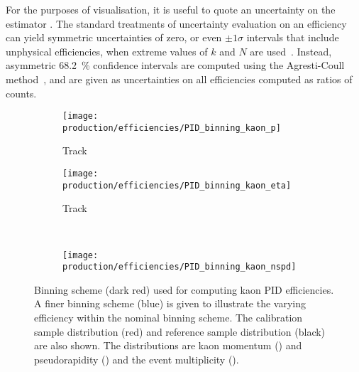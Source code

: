 For the purposes of visualisation, it is useful to quote an uncertainty on the
estimator \effest.
The standard treatments of uncertainty evaluation on an efficiency can yield
symmetric uncertainties of zero, or even $\pm1\sigma$ intervals that include
unphysical efficiencies, when extreme values of $k$ and $N$ are
used~\cite{Paterno:2004cb}.
Instead, asymmetric \SI{68.2}{\percent} confidence intervals are computed using
the Agresti-Coull method~\cite{Agresti:2685469}, and are given as uncertainties
on all efficiencies computed as ratios of counts.

\begin{table}
  \centering
  \caption{%
    Efficiency $1/\efftruth$ of
    the truth matching requirement applied in the simulation.
  }
  \label{tab:prod:effs:truth_matching}
  
\end{table}

\begin{figure}
  \begin{subfigure}[b]{0.5\textwidth}
    \centering
    \texttt{[image: production/efficiencies/PID\_binning\_kaon\_p]}
    \caption{Track \ptot}
    \label{fig:prod:effs:pid:binning:kaon:p}
  \end{subfigure}
  \begin{subfigure}[b]{0.5\textwidth}
    \centering
    \texttt{[image: production/efficiencies/PID\_binning\_kaon\_eta]}
    \caption{Track \Eta}
    \label{fig:prod:effs:pid:binning:kaon:eta}
  \end{subfigure}
  \\[0.5cm]
  \begin{subfigure}[b]{0.5\textwidth}
    \centering
    \texttt{[image: production/efficiencies/PID\_binning\_kaon\_nspd]}
    \caption{\nspd}
    \label{fig:prod:effs:pid:binning:kaon:nspd}
  \end{subfigure}
  \caption{%
    Binning scheme (dark red) used for computing kaon \ac{PID} efficiencies.
    A finer binning scheme (blue) is given to illustrate the varying efficiency
    within the nominal binning scheme.
    The calibration sample distribution (red) and reference sample distribution
    (black) are also shown.
    The distributions are kaon momentum
    () and pseudorapidity
    () and the event multiplicity
    ().
  }
  \label{fig:prod:pid:binning:kaon}
\end{figure}


